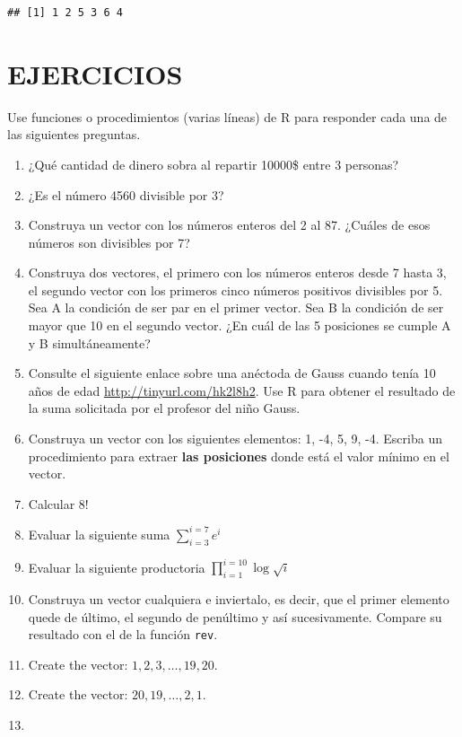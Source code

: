 \documentclass[10pt,]{krantz}
\let\proglang=\textsf
\begin{document}
\begin{verbatim}
## [1] 1 2 5 3 6 4
\end{verbatim}

\section*{EJERCICIOS}\label{ejercicios-1}


Use funciones o procedimientos (varias líneas) de \proglang{R} para
responder cada una de las siguientes preguntas.

\begin{enumerate}
\def\labelenumi{\arabic{enumi}.}
\item
  ¿Qué cantidad de dinero sobra al repartir 10000\$ entre 3 personas?
\item
  ¿Es el número 4560 divisible por 3?
\item
  Construya un vector con los números enteros del 2 al 87. ¿Cuáles de
  esos números son divisibles por 7?
\item
  Construya dos vectores, el primero con los números enteros desde 7
  hasta 3, el segundo vector con los primeros cinco números positivos
  divisibles por 5. Sea A la condición de ser par en el primer vector.
  Sea B la condición de ser mayor que 10 en el segundo vector. ¿En cuál
  de las 5 posiciones se cumple A y B simultáneamente?
\item
  Consulte el siguiente enlace sobre una anéctoda de Gauss cuando tenía
  10 años de edad \url{http://tinyurl.com/hk2l8h2}. Use R para obtener
  el resultado de la suma solicitada por el profesor del niño Gauss.
\item
  Construya un vector con los siguientes elementos: 1, -4, 5, 9, -4.
  Escriba un procedimiento para extraer \textbf{las posiciones} donde
  está el valor mínimo en el vector.
\item
  Calcular \(8!\)
\item
  Evaluar la siguiente suma \(\sum_{i=3}^{i=7}e^i\)
\item
  Evaluar la siguiente productoria \(\prod_{i=1}^{i=10}\log\sqrt{i}\)
\item
  Construya un vector cualquiera e inviertalo, es decir, que el primer
  elemento quede de último, el segundo de penúltimo y así sucesivamente.
  Compare su resultado con el de la función \texttt{rev}.
\item
  Create the vector: \(1, 2, 3, \ldots, 19, 20\).
\item
  Create the vector: \(20, 19, \ldots , 2, 1\).
\item

\end{enumerate}
\end{document}
